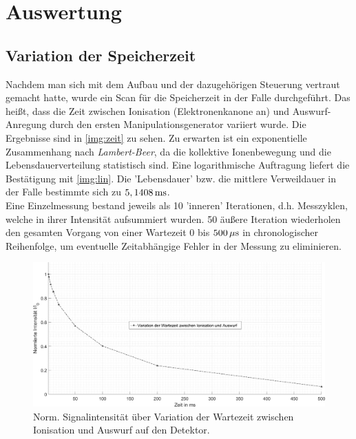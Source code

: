 \documentclass[numbers=noenddot,a4paper,notitlepage,twoside,BCOR15mm]{scrartcl}
\newcommand{\tilt}[1]{\textit{#1}}
\begin{document}
	\clearpage
	\section{Auswertung}

		\subsection{Variation der Speicherzeit}

			Nachdem man sich mit dem Aufbau und der dazugehörigen Steuerung vertraut gemacht hatte, wurde ein Scan für die Speicherzeit in der Falle durchgeführt. Das heißt, dass die Zeit zwischen Ionisation (Elektronenkanone an) und Auswurf-Anregung durch den ersten Manipulationsgenerator variiert wurde. Die Ergebnisse sind in \autoref{img:zeit} zu sehen. Zu erwarten ist ein exponentielle Zusammenhang nach \tilt{Lambert-Beer}, da die kollektive Ionenbewegung und die Lebensdauerverteilung statistisch sind. Eine logarithmische Auftragung liefert die Bestätigung mit \autoref{img:lin}. Die 'Lebensdauer' bzw. die mittlere Verweildauer in der Falle bestimmte sich zu $\unit[5,1408]{ms}$.\\
			Eine Einzelmessung bestand jeweils als 10 'inneren' Iterationen, d.h. Messzyklen, welche in ihrer Intensität aufsummiert wurden. 50 äußere Iteration wiederholen den gesamten Vorgang von einer Wartezeit 0 bis $\unit[500]{\mu s}$ in chronologischer Reihenfolge, um eventuelle Zeitabhängige Fehler in der Messung zu eliminieren.

				\begin{figure}
					\includegraphics[width=\textwidth]{wartezeit.png}
					\caption{Norm. Signalintensität über Variation der Wartezeit zwischen Ionisation und Auswurf auf den Detektor.}\label{img:zeit}
				\end{figure}
\end{document}
